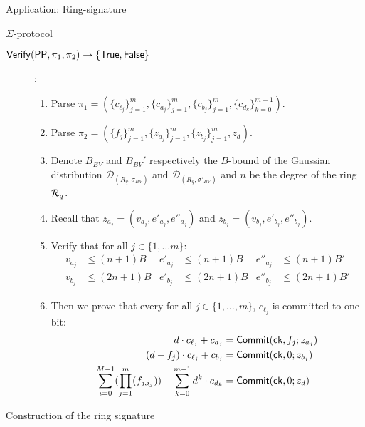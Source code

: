 \begin{section}{Application: Ring-signature}
\begin{subsection}{$\Sigma$-protocol}
\begin{description}
        \item [${\mathsf{Verify}}({\mathsf{PP}}, \pi_1, \pi_2) \to \{\mathsf{True}, \mathsf{False}\}$]:
        \begin{enumerate}
          \item Parse $\pi_1 = (\{c_{\ell_j}\}_{j = 1}^m, \{c_{a_j}\}_{j = 1}^m,\{c_{b_j}\}_{j = 1}^m,\{c_{d_k}\}_{k = 0}^{m-1})$.
          \item Parse $\pi_2 = (\{f_j\}_{j = 1}^m, \{z_{a_j}\}_{j = 1}^m, \{z_{b_j}\}_{j = 1}^m, z_d)$.
          \item Denote $B_{BV}$ and $B_{BV}'$ respectively the $B$-bound of the Gaussian distribution $\mathcal{D}_{(R_q, \sigma_{BV})}$ and $\mathcal{D}_{(R_q, \sigma'_{BV})}$ and $n$ be the degree of the ring ${\mathcal{R}}_q$.
          \item Recall that $z_{a_j} = (v_{a_j}, e'_{a_j}, e''_{a_j})$ and $z_{b_j} = (v_{b_j}, e'_{b_j}, e''_{b_j})$.
          \item Verify that for all $j \in \{1, \dots m\}$:
          \begin{align*}
            v_{a_j} &\leq (n+1) B & e'_{a_j} &\leq (n+1) B & e''_{a_j} &\leq (n+1) B'\\
            v_{b_j} &\leq (2n+1) B & e'_{b_j} &\leq (2n+1) B & e''_{b_j} &\leq (2n+1) B'
          \end{align*}
          \item Then we prove that every for all $j \in \{1, \dots, m\}$, $c_{\ell_j}$ is committed to one bit:
          \begin{align*}
            d \cdot c_{\ell_j} + c_{a_j} &= {\mathsf{Commit}}(\mathsf{ck}, f_j ; z_{a_j})\\
            (d-f_{j}) \cdot c_{\ell_j} + c_{b_j} &= {\mathsf{Commit}}(\mathsf{ck}, 0; z_{b_j})\\
            \sum_{i = 0}^{M-1}(\prod_{j = 1}^{m} (f_{j,i_j})) - \sum_{k = 0}^{m-1} d^{k} \cdot c_{d_{k}} & = {\mathsf{Commit}}(\mathsf{ck}, 0; z_d)
          \end{align*}
        \end{enumerate}
    \end{description}
  \end{subsection}

  \begin{subsection}{Construction of the ring signature}


\end{subsection}
\end{section}
